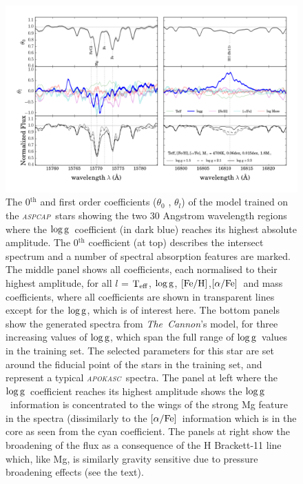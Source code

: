 \documentclass[12pt, preprint]{aastex}
\newcommand{\project}[1]{\textsl{#1}}
\newcommand{\tc}{\project{The~Cannon}}
\newcommand{\apokasc}{\project{\textsc{apokasc}}}
\newcommand{\aspcap}{\project{\textsc{aspcap}}}
\newcommand{\teff}{\mbox{$\rm T_{eff}$}}
\newcommand{\feh}{\mbox{$\rm [Fe/H]$}}
\newcommand{\alphafe}{\mbox{$\rm [\alpha/Fe]$}}
\newcommand{\logg}{\mbox{$\rm \log g$}}
\begin{document}
\begin{figure}[p]
\centering
    \includegraphics[scale=0.51]{./plots/coeffs_g_3.png}
  \caption{The 0$^{\mbox{th}}$ and first order coefficients ($\theta_0$ , $\theta_{\mbox{$l$}}$) of the model trained on the \aspcap\ stars showing the two 30 Angstrom wavelength regions where the \logg\ coefficient (in dark blue) reaches its highest absolute amplitude. The 0$^{\mbox{th}}$ coefficient (at top) describes the intersect spectrum and a number of spectral absorption features are marked. The middle panel shows all coefficients, each normalised to their highest amplitude, for all \textit{$l$} = \teff, \logg, \feh,\alphafe\ and mass coefficients, where all coefficients are shown in transparent lines except for the \logg, which is of interest here. The bottom panels show the generated spectra from \tc's model, for three increasing values of \logg, which span the full range of \logg\ values in the training set. The selected parameters for this star are set around the fiducial point of the stars in the training set, and represent a typical \apokasc\ spectra. The panel at left where the \logg\ coefficient reaches its highest amplitude shows the \logg\ information is concentrated to the wings of the strong Mg feature in the spectra (dissimilarly to the \alphafe\ information which is in the core as seen from the cyan coefficient. The panels at right show the broadening of the flux as a consequence of the H Brackett-11 line which, like Mg,  is similarly gravity sensitive due to pressure broadening effects (see the text). }
\label{fig:logg}
\end{figure}
\end{document}
